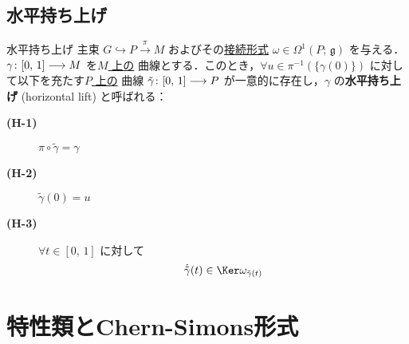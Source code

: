 \documentclass[TQFT_main]{subfiles}
\begin{document}
\subsection{水平持ち上げ}

\begin{mydef}[label=def:horizontal-lift]{水平持ち上げ}
    主束 $G \hookrightarrow P \xrightarrow{\pi} M$ およびその\hyperref[def:connection]{接続形式} $\omega \in \Omega^1(P;\, \mathfrak{g})$ を与える．
    $\gamma \colon [0,\, 1] \longrightarrow M$ を\underline{$M$ 上の} \cinfty 曲線とする．このとき，$\forall u \in \pi^{-1}(\{\gamma(0)\})$ に対して以下を充たす\underline{$P$ 上の} \cinfty 曲線 $\tilde{\gamma} \colon [0,\, 1] \longrightarrow P$ が一意的に存在し，$\gamma$ の\textbf{水平持ち上げ} (horizontal lift) と呼ばれる：
    \begin{description}
        \item[\textbf{(H-1)}] $\pi \circ \tilde{\gamma} = \gamma$
        \item[\textbf{(H-2)}] $\tilde{\gamma}(0) = u$
        \item[\textbf{(H-3)}] $\forall t \in [0,\, 1]$ に対して
        \begin{align}
            \dot{\tilde{\gamma}}(t) \in \Ker \omega_{\tilde{\gamma}(t)}
        \end{align}
    \end{description}
\end{mydef}





\section{特性類とChern-Simons形式}
\end{document}
